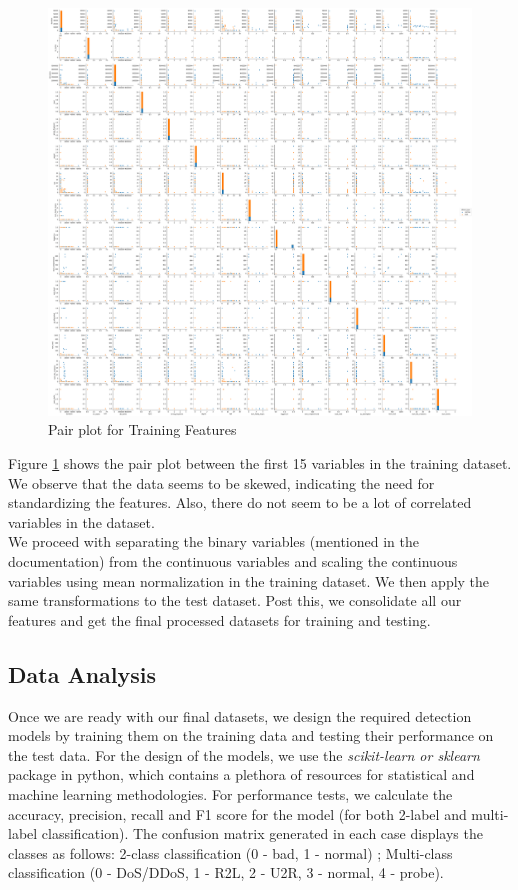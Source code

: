 \begin{figure}
	\includegraphics[width=1.0\columnwidth]{images/pairplot.png}
	\caption{Pair plot for Training Features}
	\label{F:pair}
\end{figure}
Figure \ref{F:pair} shows the pair plot between the first 15 variables in the training dataset. We observe that the data seems to be skewed, indicating the need for standardizing the features. Also, there do not seem to be a lot of correlated variables in the dataset.\\
We proceed with separating the binary variables (mentioned in the documentation) from the continuous variables and scaling the continuous variables using mean normalization in the training dataset. We then apply the same transformations to the test dataset. Post this, we consolidate all our features and get the final processed datasets for training and testing.

\subsection{Data Analysis}
Once we are ready with our final datasets, we design the required detection models by training them on the training data and testing their performance on the test data. For the design of the models, we use the {\em scikit-learn or sklearn} package in python, which contains a plethora of resources for statistical and machine learning methodologies. For performance tests, we calculate the accuracy, precision, recall and F1 score for the model (for both 2-label and multi-label classification). The confusion matrix generated in each case displays the classes as follows: 2-class classification (0 - bad, 1 - normal) ; Multi-class classification (0 - DoS/DDoS, 1 - R2L, 2 - U2R, 3 - normal, 4 - probe).

